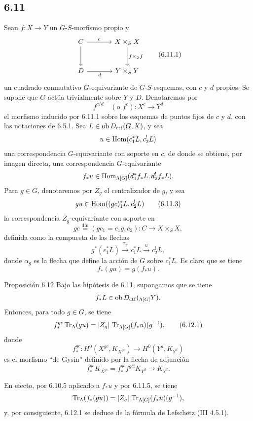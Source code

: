 \subsection*{6.11}
Sean $f:X\to Y$ un $G$-$S$-morfismo propio y
\begin{equation}
\begin{tikzcd}[column sep=large,row sep=large]
C \arrow[r,"c"] \arrow[d] & X\times_SX \arrow[d,"f\times_Sf"]\\
D \arrow[r,"d"'] & Y\times_SY
\end{tikzcd}
\tag{6.11.1}
\end{equation}
un cuadrado conmutativo $G$-equivariante de $G$-$S$-esquemas, con $c$ y $d$ propios. Se supone que $G$ actúa trivialmente sobre $Y$ y $D$. Denotaremos por
\begin{equation}
f^{c/d}\quad(\text{o } f^c):X^c\longrightarrow Y^d
\tag{6.11.2}
\end{equation}
el morfismo inducido por 6.11.1 sobre los esquemas de puntos fijos de $c$ y $d$, con las notaciones de 6.5.1. Sea $L\in\operatorname{ob} D_{\mathrm{ctf}}(G,X)$, y sea
\[
u\in\operatorname{Hom}(c_1^*L,c_2^!L)
\]
una correspondencia $G$-equivariante con soporte en $c$, de donde se obtiene, por imagen directa, una correspondencia $G$-equivariante
\[
f_*u\in\operatorname{Hom}_{\Lambda[G]}(d_1^*f_*L,d_2^!f_*L).
\]
Para $g\in G$, denotaremos por $Z_g$ el centralizador de $g$, y sea
\begin{equation}
gu\in\operatorname{Hom}((gc)_1^*L,c_2^!L)
\tag{6.11.3}
\end{equation}
la correspondencia $Z_g$-equivariante con soporte en
\begin{equation}
gc\stackrel{\mathrm{dfn}}{=}(gc_1=c_1g,c_2):C\to X\times_SX,
\tag{6.11.4}
\end{equation}
definida como la compuesta de las flechas
\[
g^*(c_1^*L)\xrightarrow{\alpha_g}c_1^*L\xrightarrow{u}c_2^!L,
\]
donde $\alpha_g$ es la flecha que define la acción de $G$ sobre $c_1^*L$. Es claro que se tiene
\begin{equation}
f_*(gu)=g(f_*u).
\tag{6.11.5}
\end{equation}

\begin{statement}{Proposición 6.12}
Bajo las hipótesis de 6.11, supongamos que se tiene
\[
f_*L\in\operatorname{ob} D_{\mathrm{ctf}}({}_{\Lambda[G]}Y).
\]
Entonces, para todo $g\in G$, se tiene
\begin{equation}
f_*^{gc}\operatorname{Tr}_{\Lambda}(gu)
=
|Z_g|\,\operatorname{Tr}_{\Lambda[G]}(f_*u)(g^{-1}),
\tag{6.12.1}
\end{equation}
donde
\[
f_*^{gc}:H^0(X^{gc},K_{X^{gc}})\longrightarrow H^0(Y^d,K_{Y^d})
\]
es el morfismo ``de Gysin'' definido por la flecha de adjunción
\[
f_*^{gc}K_{X^{gc}}=f_*^{gc}f^{gc!}K_{Y^d}\longrightarrow K_{Y^d}.
\]
\end{statement}

En efecto, por 6.10.5 aplicado a $f_*u$ y por 6.11.5, se tiene
\[
\operatorname{Tr}_{\Lambda}(f_*(gu))=|Z_g|\,\operatorname{Tr}_{\Lambda[G]}(f_*u)(g^{-1}),
\]
y, por consiguiente, 6.12.1 se deduce de la fórmula de Lefschetz (III 4.5.1).
